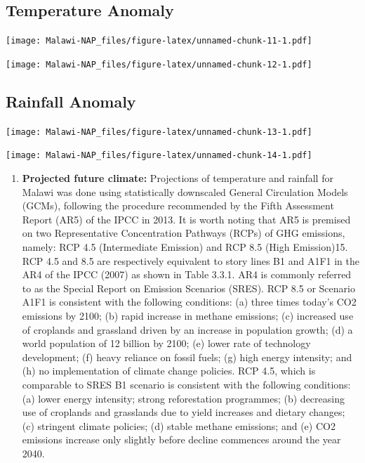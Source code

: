 \documentclass[
]{book}
\providecommand{\tightlist}{%
  \setlength{\itemsep}{0pt}\setlength{\parskip}{0pt}}
\begin{document}
\hypertarget{temperature-anomaly}{%
\subsection{Temperature Anomaly}\label{temperature-anomaly}}

\texttt{[image: Malawi-NAP\_files/figure-latex/unnamed-chunk-11-1.pdf]}

\texttt{[image: Malawi-NAP\_files/figure-latex/unnamed-chunk-12-1.pdf]}

\hypertarget{rainfall-anomaly}{%
\subsection{Rainfall Anomaly}\label{rainfall-anomaly}}

\texttt{[image: Malawi-NAP\_files/figure-latex/unnamed-chunk-13-1.pdf]}

\texttt{[image: Malawi-NAP\_files/figure-latex/unnamed-chunk-14-1.pdf]}

\begin{enumerate}
\def\labelenumi{\arabic{enumi}.}
\setcounter{enumi}{50}
\tightlist
\item
  \textbf{Projected future climate:} Projections of temperature and rainfall for Malawi was done using statistically downscaled General Circulation Models (GCMs), following the procedure recommended by the Fifth Assessment Report (AR5) of the IPCC in 2013. It is worth noting that AR5 is premised on two Representative Concentration Pathways (RCPs) of GHG emissions, namely: RCP 4.5 (Intermediate Emission) and RCP 8.5 (High Emission)15. RCP 4.5 and 8.5 are respectively equivalent to story lines B1 and A1F1 in the AR4 of the IPCC (2007) as shown in Table 3.3.1. AR4 is commonly referred to as the Special Report on Emission Scenarios (SRES). RCP 8.5 or Scenario A1F1 is consistent with the following conditions: (a) three times today's CO2 emissions by 2100; (b) rapid increase in methane emissions; (c) increased use of croplands and grassland driven by an increase in population growth; (d) a world population of 12 billion by 2100; (e) lower rate of technology development; (f) heavy reliance on fossil fuels; (g) high energy intensity; and (h) no implementation of climate change policies. RCP 4.5, which is comparable to SRES B1 scenario is consistent with the following conditions: (a) lower energy intensity; strong reforestation programmes; (b) decreasing use of croplands and grasslands due to yield increases and dietary changes; (c) stringent climate policies; (d) stable methane emissions; and (e) CO2 emissions increase only slightly before decline commences around the year 2040.
\end{enumerate}
\end{document}

